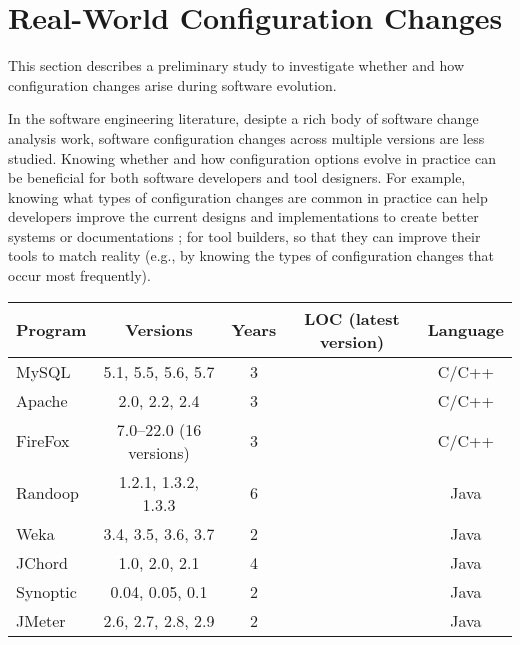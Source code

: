 \section{Real-World Configuration Changes}
\label{sec:study}

This section describes a preliminary study to investigate whether
and how configuration changes arise during software evolution.

In the software engineering literature, desipte a rich body of
software change analysis work, 
software configuration changes across multiple
versions are less studied.
Knowing whether and how configuration options evolve in practice
can be beneficial for both software developers
and tool designers. For example, knowing what types
of configuration changes are common in practice
can help developers improve the current designs and
implementations to create better systems or documentations
; for tool builders, so that they can improve their tools
to match reality (e.g., by knowing the types of configuration
changes that occur most frequently).


\begin{table}[t]
\vspace{1mm}
\centering
\small{
\setlength{\tabcolsep}{.40\tabcolsep}
\begin{tabular}{|l||c|c|c|c|}
\hline
 Program & Versions & Years & LOC (latest version)  & Language\\
 \hline
 \hline
 MySQL & 5.1, 5.5, 5.6, 5.7 & 3 && C/C++\\
 Apache& 2.0, 2.2, 2.4 & 3  & &C/C++\\
 FireFox& 7.0--22.0 (16 versions) & 3  & &C/C++\\
 Randoop & 1.2.1, 1.3.2, 1.3.3 & 6 &    &Java\\
 Weka & 3.4, 3.5, 3.6, 3.7  & 2  &  &Java\\
 JChord & 1.0, 2.0, 2.1 &  4 &   &Java\\
 Synoptic & 0.04, 0.05, 0.1 & 2   & &Java\\
 JMeter & 2.6, 2.7, 2.8, 2.9& 2   & &Java\\
\hline
\end{tabular}
}
\vspace{-2mm}
\end{table}


